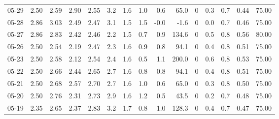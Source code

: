 \begin{threeparttable}
{\begin{tabular}{lrrrrrrrrrrrrrr}
  05-29 &          2.50 &          2.59 &          2.90 &        2.55 &                 3.2 &                1.6 &                 1.0 &        0.6 &         65.0 &              0 &                 0.3 &              0.7 &            0.44 &                  75.00 \\
  05-28 &          2.86 &          3.03 &          2.49 &        2.47 &                 3.1 &                1.5 &                 1.5 &       -0.0 &         -1.6 &              0 &                 0.0 &              0.7 &            0.46 &                  75.00 \\
  05-27 &          2.86 &          2.83 &          2.42 &        2.46 &                 2.2 &                1.5 &                 0.7 &        0.9 &        134.6 &              0 &                 0.5 &              0.8 &            0.56 &                  80.00 \\
  05-26 &          2.50 &          2.54 &          2.19 &        2.47 &                 2.3 &                1.6 &                 0.9 &        0.8 &         94.1 &              0 &                 0.4 &              0.8 &            0.51 &                  75.00 \\
  05-23 &          2.50 &          2.58 &          2.12 &        2.54 &                 2.4 &                1.6 &                 0.5 &        1.1 &        200.0 &              0 &                 0.6 &              0.8 &            0.53 &                  75.00 \\
  05-22 &          2.50 &          2.66 &          2.44 &        2.65 &                 2.7 &                1.6 &                 0.8 &        0.8 &         94.1 &              0 &                 0.4 &              0.8 &            0.51 &                  75.00 \\
  05-21 &          2.50 &          2.68 &          2.57 &        2.70 &                 2.7 &                1.6 &                 1.0 &        0.6 &         65.0 &              0 &                 0.3 &              0.8 &            0.50 &                  75.00 \\
  05-20 &          2.50 &          2.76 &          2.31 &        2.73 &                 2.9 &                1.6 &                 1.2 &        0.5 &         43.5 &              0 &                 0.2 &              0.7 &            0.48 &                  75.00 \\
  05-19 &          2.35 &          2.65 &          2.37 &        2.83 &                 3.2 &                1.7 &                 0.8 &        1.0 &        128.3 &              0 &                 0.4 &              0.7 &            0.47 &                  75.00 \\

\end{tabular}}
\end{threeparttable}
